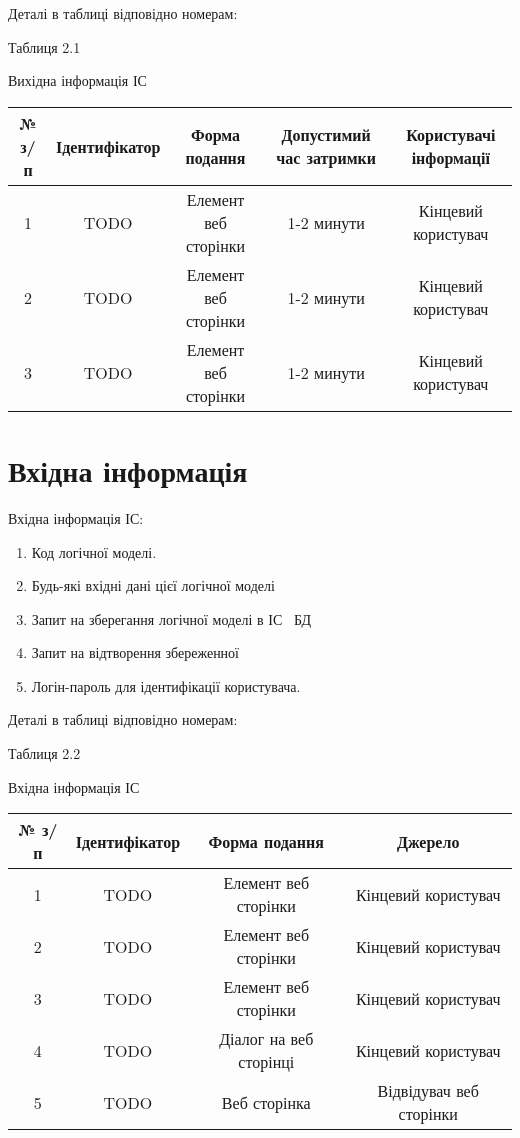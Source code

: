 Деталі в таблиці відповідно номерам:

\begin{flushright}\small {Таблиця 2.1} \end{flushright}
\begin{center}
Вихідна інформація ІС
\small{
\begin{tabular}{ | c | c | c | c | c | }
\hline
 № з/п  & Ідентифікатор & Форма подання & Допустимий час затримки & Користувачі інформації \\ 
\hline
 1 & TODO & Елемент веб сторінки & 1-2 минути & Кінцевий користувач \\  
\hline
 2 & TODO & Елемент веб сторінки & 1-2 минути & Кінцевий користувач \\  
\hline
 3 & TODO & Елемент веб сторінки & 1-2 минути & Кінцевий користувач \\  
\hline
\end{tabular}
}
\end{center}


\section{Вхідна інформація}

Вхідна інформація ІС: 

\begin{enumerate}
	\item Код логічної моделі.
	\item Будь-які вхідні дані цієї логічної моделі
	\item Запит на зберегання логічної моделі в ІС \ БД
	\item Запит на відтворення збереженної 
	\item Логін-пароль для ідентифікації користувача.
\end{enumerate}

Деталі в таблиці відповідно номерам:

\begin{flushright}\small {Таблиця 2.2} \end{flushright}
\begin{center}
Вхідна інформація ІС
\small{
\begin{tabular}{ | c | c | c | c |  }
\hline
 № з/п  & Ідентифікатор & Форма подання & Джерело \\ 
\hline
 1 & TODO & Елемент веб сторінки & Кінцевий користувач \\  
\hline
 2 & TODO & Елемент веб сторінки & Кінцевий користувач \\  
\hline
 3 & TODO & Елемент веб сторінки & Кінцевий користувач \\  
\hline
 4 & TODO & Діалог на веб сторінці & Кінцевий користувач \\  
\hline
 5 & TODO & Веб сторінка & Відвідувач веб сторінки \\  
\hline
\end{tabular}
}
\end{center}


